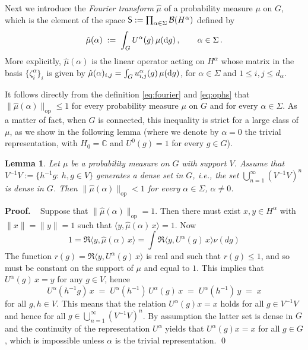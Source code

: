 \documentclass[a4paper,reqno,11pt]{amsart}
\numberwithin{equation}{section}
\newtheorem{lemma}[theorem]{Lemma}
\newcommand{\cB}{{\ensuremath{\mathcal B}} }
\newcommand{\ga}{\alpha}
\newcommand{\dd}{\text{\rm d}}             %
\DeclareMathOperator*{\union}{\bigcup}       %
\newcommand{\C}{\mathbb{C}}
\def\proof{\noindent\textbf{Proof.} \ }
\begin{document}
Next we introduce the {\sl Fourier transform} $\hat\mu$ of a
probability measure $\mu$ on $G$, which is the element of the space
${\sf S} := \prod_{\alpha \in \Sigma} \cB(H^\alpha)$ defined by
\begin{equation} \label{eq:fourier}
	\hat \mu(\alpha) \;:=\; \int_G U^{\alpha}(g) \,\mu(\dd g) \,, \qquad
\alpha \in \Sigma\,.
\end{equation}
More explicitly, $\hat \mu(\alpha)$ is the linear operator
acting on $H^\alpha$ whose matrix
in the basis $\{\zeta^\alpha_i\}_{i}$ is given by
$\hat \mu(\alpha)_{i,j} = \int_G u^\alpha_{i,j}(g)\, \mu(\dd g)$,
for $\alpha \in \Sigma$ and $1 \le i,j \le d_\alpha$.


It follows directly from the definition \eqref{eq:fourier} and \eqref{eq:ophs}
that $\|\hat \mu(\alpha)\|_{\text{op}} \le 1$ for every
probability measure $\mu$ on $G$ and for every
$\alpha \in \Sigma$. As a matter of fact, when $G$ is connected, this
inequality is strict for a large class of $\mu$,
as we show in the following lemma (where we denote by
$\alpha = 0$ the trivial representation, with
$H_0 = \C$ and $U^0(g) = 1$ for every $g \in G$).

\smallskip
\begin{lemma} \label{lem:1}
Let $\mu$ be a probability measure on $G$ with support $V$.
Assume that $V^{-1} V := \{h^{-1}g:\, h,g \in V\}$ generates a dense set in $G$, 
{\sl i.e.}, the set $\union_{n=1}^\infty (V^{-1} V)^n$ is dense in $G$.
Then $\|\hat \mu(\alpha)\|_{\text{op}} < 1$ for
every $\alpha \in \Sigma$, $\alpha \ne 0$.
\end{lemma}
\smallskip



\proof
Suppose that $\|\hat\mu(\alpha)\|_{\text{op}} = 1$. Then there must
exist $x,y \in H^\alpha$ with $\|x\| = \|y\| = 1$ 
such that $ \langle y, \hat \mu(\alpha)\, x \rangle  = 1$.
Now
\begin{equation}
1= \Re \langle y , \hat \mu(\alpha) \,x \rangle 
= \int \Re \langle y,U^\alpha(g)\, x \rangle \nu(dg)
\end{equation}
The function $r(g) = \Re \langle y,U^\alpha(g)\,x\rangle$ is real and such that 
$r(g)\le 1$, and so must be constant on the support of $\mu$ and equal to $1$. 
This implies that $U^\alpha(g)\, x = y$ for any $g\in V$, hence
\begin{equation}
	U^\ga(h^{-1}g)\, x \;=\; U^\ga(h^{-1})\, U^\ga(g)\, x 
	\;=\; U^\ga(h^{-1})\, y \;=\; x
\end{equation}
for all $g,h \in V$. This means that the relation $U^\ga(g) x = x$
holds for all $g \in V^{-1}V$ and hence for all $g \in \union_{n=1}^\infty
(V^{-1} V)^n$. By assumption the latter set is dense in $G$ and the continuity
of the representation $U^\ga$ yields that $U^\ga(g) x = x$ for all $g \in G$,
which is impossible unless $\ga$ is the trivial representation.
\qed
\medskip
\end{document}
